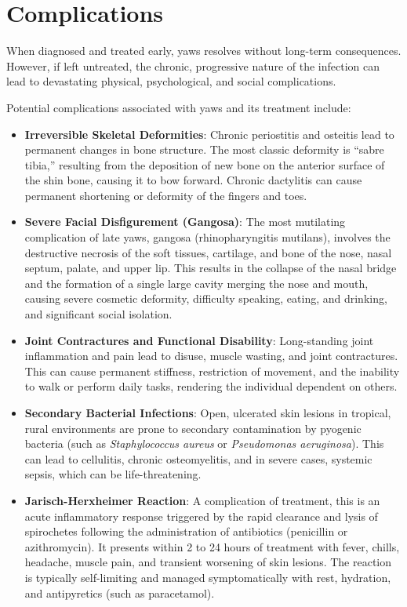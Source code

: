 \section*{Complications}
When diagnosed and treated early, yaws resolves without long-term consequences. However, if left untreated, the chronic, progressive nature of the infection can lead to devastating physical, psychological, and social complications.

Potential complications associated with yaws and its treatment include:
\begin{itemize}
    \item \textbf{Irreversible Skeletal Deformities}: Chronic periostitis and osteitis lead to permanent changes in bone structure. The most classic deformity is ``sabre tibia,'' resulting from the deposition of new bone on the anterior surface of the shin bone, causing it to bow forward. Chronic dactylitis can cause permanent shortening or deformity of the fingers and toes.
    \item \textbf{Severe Facial Disfigurement (Gangosa)}: The most mutilating complication of late yaws, gangosa (rhinopharyngitis mutilans), involves the destructive necrosis of the soft tissues, cartilage, and bone of the nose, nasal septum, palate, and upper lip. This results in the collapse of the nasal bridge and the formation of a single large cavity merging the nose and mouth, causing severe cosmetic deformity, difficulty speaking, eating, and drinking, and significant social isolation.
    \item \textbf{Joint Contractures and Functional Disability}: Long-standing joint inflammation and pain lead to disuse, muscle wasting, and joint contractures. This can cause permanent stiffness, restriction of movement, and the inability to walk or perform daily tasks, rendering the individual dependent on others.
    \item \textbf{Secondary Bacterial Infections}: Open, ulcerated skin lesions in tropical, rural environments are prone to secondary contamination by pyogenic bacteria (such as \textit{Staphylococcus aureus} or \textit{Pseudomonas aeruginosa}). This can lead to cellulitis, chronic osteomyelitis, and in severe cases, systemic sepsis, which can be life-threatening.
    \item \textbf{Jarisch-Herxheimer Reaction}: A complication of treatment, this is an acute inflammatory response triggered by the rapid clearance and lysis of spirochetes following the administration of antibiotics (penicillin or azithromycin). It presents within 2 to 24 hours of treatment with fever, chills, headache, muscle pain, and transient worsening of skin lesions. The reaction is typically self-limiting and managed symptomatically with rest, hydration, and antipyretics (such as paracetamol).

\end{itemize}
